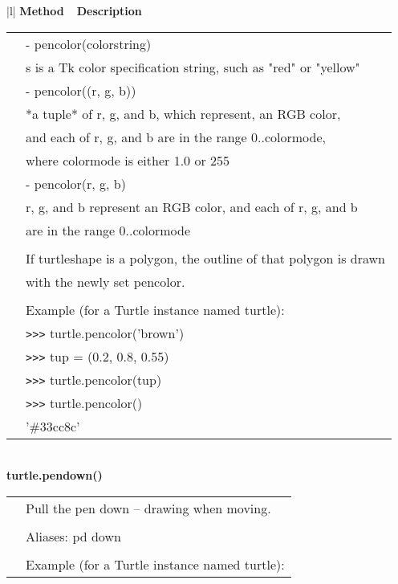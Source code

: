 \begin{center}
{\small
\begin{tabular}{|l|} \hline
{\bf Method~~Description}  \\ \hline\hline 
   \begin{tabular}{p{0.25in}p{4in}}

&          - pencolor(colorstring) \\
&            s is a Tk color specification string, such as "red" or "yellow" \\
&          - pencolor((r, g, b)) \\
&            *a tuple* of r, g, and b, which represent, an RGB color, \\
&            and each of r, g, and b are in the range 0..colormode, \\
&            where colormode is either 1.0 or 255 \\
&          - pencolor(r, g, b) \\
&            r, g, and b represent an RGB color, and each of r, g, and b \\
&            are in the range 0..colormode \\
&  \\
&        If turtleshape is a polygon, the outline of that polygon is drawn \\
&        with the newly set pencolor. \\
&  \\
&        Example (for a Turtle instance named turtle): \\
&        \verb+>+\verb+>+\verb+>+ turtle.pencolor('brown') \\
&        \verb+>+\verb+>+\verb+>+ tup = (0.2, 0.8, 0.55) \\
&        \verb+>+\verb+>+\verb+>+ turtle.pencolor(tup) \\
&        \verb+>+\verb+>+\verb+>+ turtle.pencolor() \\
&        '\#33cc8c' \\
\end{tabular} \\ \hline
{\bf    turtle.pendown()} \\
   \begin{tabular}{p{0.25in}p{4in}}
&        Pull the pen down -- drawing when moving. \\
&  \\
&        Aliases:  pd  down \\
&  \\
&        Example (for a Turtle instance named turtle): \\

\end{tabular}
\end{tabular}}
\end{center}
